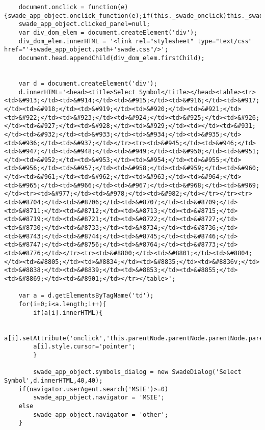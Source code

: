 \begin{lstlisting}
    document.onclick = function(e){swade_app_object.onclick_function(e);if(this._swade_onclick)this._swade_onclick();}
    swade_app_object.clicked_panel=null;
    var div_dom_elem = document.createElement('div');
    div_dom_elem.innerHTML = '<link rel="stylesheet" type="text/css" href="'+swade_app_object.path+'swade.css"/>';
    document.head.appendChild(div_dom_elem.firstChild);

    
    var d = document.createElement('div');
    d.innerHTML='<head><title>Select Symbol</title></head><table><tr><td>&#913;</td><td>&#914;</td><td>&#915;</td><td>&#916;</td><td>&#917;</td><td>&#918;</td><td>&#919;</td><td>&#920;</td><td>&#921;</td><td>&#922;</td><td>&#923;</td><td>&#924;</td><td>&#925;</td><td>&#926;</td><td>&#927;</td><td>&#928;</td><td>&#929;</td><td></td><td>&#931;</td><td>&#932;</td><td>&#933;</td><td>&#934;</td><td>&#935;</td><td>&#936;</td><td>&#937;</td></tr><tr><td>&#945;</td><td>&#946;</td><td>&#947;</td><td>&#948;</td><td>&#949;</td><td>&#950;</td><td>&#951;</td><td>&#952;</td><td>&#953;</td><td>&#954;</td><td>&#955;</td><td>&#956;</td><td>&#957;</td><td>&#958;</td><td>&#959;</td><td>&#960;</td><td>&#961;</td><td>&#962;</td><td>&#963;</td><td>&#964;</td><td>&#965;</td><td>&#966;</td><td>&#967;</td><td>&#968;</td><td>&#969;</td><tr><td>&#977;</td><td>&#978;</td><td>&#982;</td></tr></tr><tr><td>&#8704;</td><td>&#8706;</td><td>&#8707;</td><td>&#8709;</td><td>&#8711;</td><td>&#8712;</td><td>&#8713;</td><td>&#8715;</td><td>&#8719;</td><td>&#8721;</td><td>&#8722;</td><td>&#8727;</td><td>&#8730;</td><td>&#8733;</td><td>&#8734;</td><td>&#8736;</td><td>&#8743;</td><td>&#8744;</td><td>&#8745;</td><td>&#8746;</td><td>&#8747;</td><td>&#8756;</td><td>&#8764;</td><td>&#8773;</td><td>&#8776;</td></tr><tr><td>&#8800;</td><td>&#8801;</td><td>&#8804;</td><td>&#8805;</td><td>&#8834;</td><td>&#8835;</td><td>&#8836v;</td><td>&#8838;</td><td>&#8839;</td><td>&#8853;</td><td>&#8855;</td><td>&#8869;</td><td>&#8901;</td></tr></table>';

    var a = d.getElementsByTagName('td');
    for(i=0;i<a.length;i++){
        if(a[i].innerHTML){

	    a[i].setAttribute('onclick','this.parentNode.parentNode.parentNode.parentNode.parentNode.style.visibility="hidden";SwadeManager.restoreSelection(swade_app.selection);SwadeManager.pasteHtmlAtCaret(this.innerHTML);');
	    a[i].style.cursor='pointer';
        }

        swade_app_object.symbols_dialog = new SwadeDialog('Select Symbol',d.innerHTML,40,40);
	if(navigator.userAgent.search('MSIE')>=0)
	    swade_app_object.navigator = 'MSIE';
	else
	    swade_app_object.navigator = 'other';
    }


\end{lstlisting}

